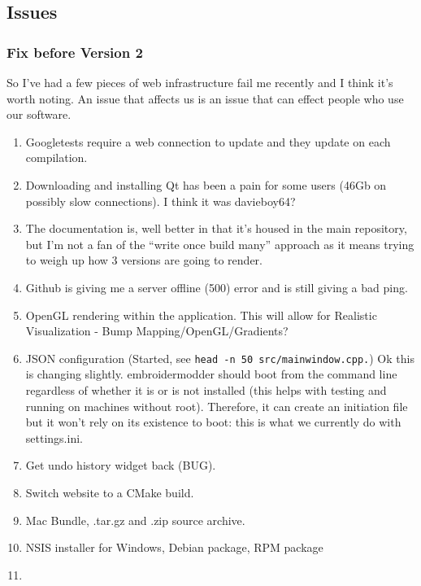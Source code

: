 \hypertarget{issues-1}{%
\subsection{Issues}\label{issues-1}}

\hypertarget{fix-before-version-2-1}{%
\subsubsection{Fix before Version 2}\label{fix-before-version-2-1}}

So I've had a few pieces of web infrastructure fail me recently and I
think it's worth noting. An issue that affects us is an issue that can
effect people who use our software.

\begin{enumerate}
\def\labelenumi{\arabic{enumi}.}
\tightlist
\item
  Googletests require a web connection to update and they update on each
  compilation.
\item
  Downloading and installing Qt has been a pain for some users (46Gb on
  possibly slow connections). I think it was davieboy64?
\item
  The documentation is, well better in that it's housed in the main
  repository, but I'm not a fan of the ``write once build many''
  approach as it means trying to weigh up how 3 versions are going to
  render.
\item
  Github is giving me a server offline (500) error and is still giving a
  bad ping.
\item
  OpenGL rendering within the application. This will allow for Realistic
  Visualization - Bump Mapping/OpenGL/Gradients?
\item
  JSON configuration (Started, see
  \texttt{head\ -n\ 50\ src/mainwindow.cpp.}) Ok this is changing
  slightly. embroidermodder should boot from the command line regardless
  of whether it is or is not installed (this helps with testing and
  running on machines without root). Therefore, it can create an
  initiation file but it won't rely on its existence to boot: this is
  what we currently do with settings.ini.
\item
  Get undo history widget back (BUG).
\item
  Switch website to a CMake build.
\item
  Mac Bundle, .tar.gz and .zip source archive.
\item
  NSIS installer for Windows, Debian package, RPM package
\item

\end{enumerate}
